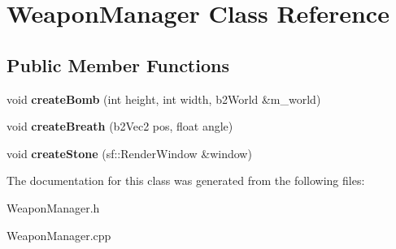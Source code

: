 \hypertarget{class_weapon_manager}{}\section{Weapon\+Manager Class Reference}
\label{class_weapon_manager}
\subsection*{Public Member Functions}
\begin{DoxyCompactItemize}
\item 
void {\bfseries create\+Bomb} (int height, int width, b2\+World \&m\+\_\+world)\hypertarget{class_weapon_manager_abc02412b24817dab9eb715b6752c8f50}{}\label{class_weapon_manager_abc02412b24817dab9eb715b6752c8f50}

\item 
void {\bfseries create\+Breath} (b2\+Vec2 pos, float angle)\hypertarget{class_weapon_manager_a35e7f118db60c3c59adf1a4257de11d1}{}\label{class_weapon_manager_a35e7f118db60c3c59adf1a4257de11d1}

\item 
void {\bfseries create\+Stone} (sf\+::\+Render\+Window \&window)\hypertarget{class_weapon_manager_a960f2a322b9510777c6f4e6c51f860b7}{}\label{class_weapon_manager_a960f2a322b9510777c6f4e6c51f860b7}

\end{DoxyCompactItemize}


The documentation for this class was generated from the following files\+:\begin{DoxyCompactItemize}
\item 
Weapon\+Manager.\+h\item 
Weapon\+Manager.\+cpp\end{DoxyCompactItemize}
